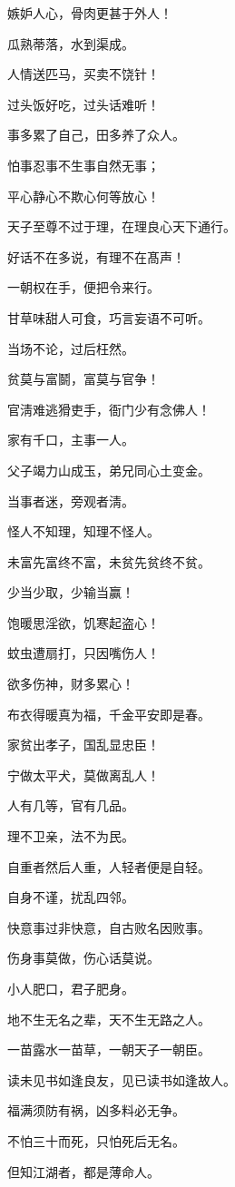 \documentclass[12pt,oneside]{book}
\begin{document}
嫉妒人心，骨肉更甚于外人！

瓜熟蒂落，水到渠成。

人情送匹马，买卖不饶针！

过头饭好吃，过头话难听！

事多累了自己，田多养了众人。

怕事忍事不生事自然无事；

平心静心不欺心何等放心！

天子至尊不过于理，在理良心天下通行。

好话不在多说，有理不在髙声！

一朝权在手，便把令来行。

甘草味甜人可食，巧言妄语不可听。

当场不论，过后枉然。

贫莫与富鬬，富莫与官争！

官淸难逃猾吏手，衙门少有念佛人！

家有千口，主事一人。

父子竭力山成玉，弟兄同心土变金。

当事者迷，旁观者淸。

怪人不知理，知理不怪人。

未富先富终不富，未贫先贫终不贫。

少当少取，少输当赢！

饱暖思淫欲，饥寒起盗心！

蚊虫遭扇打，只因嘴伤人！

欲多伤神，财多累心！

布衣得暖真为福，千金平安即是春。

家贫出孝子，国乱显忠臣！

宁做太平犬，莫做离乱人！

人有几等，官有几品。

理不卫亲，法不为民。

自重者然后人重，人轻者便是自轻。

自身不谨，扰乱四邻。

快意事过非快意，自古败名因败事。

伤身事莫做，伤心话莫说。

小人肥口，君子肥身。

地不生无名之辈，天不生无路之人。

一苗露水一苗草，一朝天子一朝臣。

读未见书如逢良友，见已读书如逢故人。

福满须防有祸，凶多料必无争。

不怕三十而死，只怕死后无名。

但知江湖者，都是薄命人。
\end{document}
